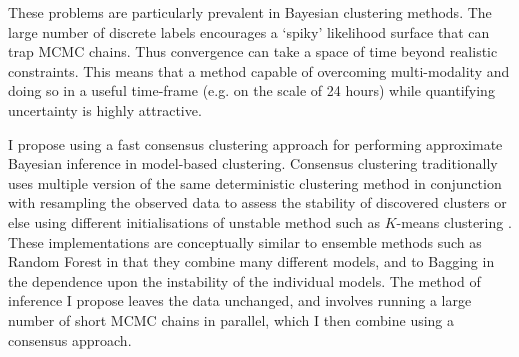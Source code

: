 \documentclass[14pt]{extarticle} %
\begin{document}
	
	These problems are particularly prevalent in Bayesian clustering methods. The large number of discrete labels encourages a `spiky' likelihood surface that can trap MCMC chains. Thus convergence can take a space of time beyond realistic constraints. This means that a method capable of overcoming multi-modality and doing so in a useful time-frame (e.g. on the scale of 24 hours) while quantifying uncertainty is highly attractive. 
	
	I propose using a fast consensus clustering approach for performing approximate Bayesian inference in model-based clustering.  Consensus clustering traditionally uses multiple version of the same deterministic clustering method in conjunction with resampling the observed data to assess the stability of discovered clusters or else using different initialisations of unstable method such as $K$-means clustering \citep{MontiConsensusClusteringResamplingBased}. These implementations are conceptually similar to ensemble methods such as Random Forest \citep{BreimanRandomForests2001} in that they combine many different models, and to Bagging \citep{BreimanBaggingpredictors1996} in the dependence upon the instability of the individual models. The method of inference I propose leaves the data unchanged, and involves running a large number of short MCMC chains in parallel, which I then combine using a consensus approach. 
	
		
	
\end{document}
